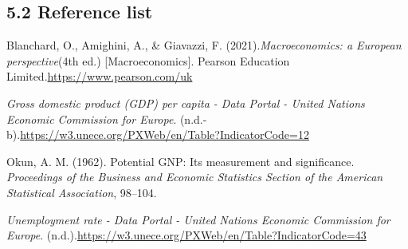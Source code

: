 \documentclass[
]{article}
\begin{document}
\subsection{5.2 Reference list}\label{reference-list}

Blanchard, O., Amighini, A., \& Giavazzi, F.
(2021).\emph{Macroeconomics: a European perspective}(4th ed.)
{[}Macroeconomics{]}. Pearson Education
Limited.\url{https://www.pearson.com/uk}

\emph{Gross domestic product (GDP) per capita - Data Portal - United
Nations Economic Commission for Europe}.
(n.d.-b).\url{https://w3.unece.org/PXWeb/en/Table?IndicatorCode=12}

Okun, A. M. (1962). Potential GNP: Its measurement and significance.
\emph{Proceedings of the Business and Economic Statistics Section of the
American Statistical Association}, 98--104.

\emph{Unemployment rate - Data Portal - United Nations Economic
Commission for Europe}.
(n.d.).\url{https://w3.unece.org/PXWeb/en/Table?IndicatorCode=43}\\
\strut \\
\end{document}
